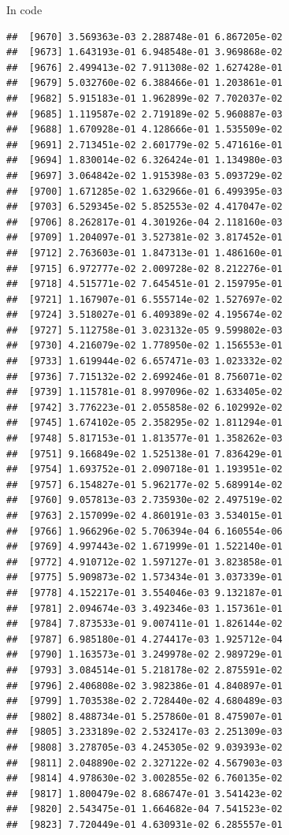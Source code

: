 \documentclass[ignorenonframetext,]{beamer}
\begin{document}
\begin{frame}[fragile]{In code}
\begin{verbatim}
##  [9670] 3.569363e-03 2.288748e-01 6.867205e-02
##  [9673] 1.643193e-01 6.948548e-01 3.969868e-02
##  [9676] 2.499413e-02 7.911308e-02 1.627428e-01
##  [9679] 5.032760e-02 6.388466e-01 1.203861e-01
##  [9682] 5.915183e-01 1.962899e-02 7.702037e-02
##  [9685] 1.119587e-02 2.719189e-02 5.960887e-03
##  [9688] 1.670928e-01 4.128666e-01 1.535509e-02
##  [9691] 2.713451e-02 2.601779e-02 5.471616e-01
##  [9694] 1.830014e-02 6.326424e-01 1.134980e-03
##  [9697] 3.064842e-02 1.915398e-03 5.093729e-02
##  [9700] 1.671285e-02 1.632966e-01 6.499395e-03
##  [9703] 6.529345e-02 5.852553e-02 4.417047e-02
##  [9706] 8.262817e-01 4.301926e-04 2.118160e-03
##  [9709] 1.204097e-01 3.527381e-02 3.817452e-01
##  [9712] 2.763603e-01 1.847313e-01 1.486160e-01
##  [9715] 6.972777e-02 2.009728e-02 8.212276e-01
##  [9718] 4.515771e-02 7.645451e-01 2.159795e-01
##  [9721] 1.167907e-01 6.555714e-02 1.527697e-02
##  [9724] 3.518027e-01 6.409389e-02 4.195674e-02
##  [9727] 5.112758e-01 3.023132e-05 9.599802e-03
##  [9730] 4.216079e-02 1.778950e-02 1.156553e-01
##  [9733] 1.619944e-02 6.657471e-03 1.023332e-02
##  [9736] 7.715132e-02 2.699246e-01 8.756071e-02
##  [9739] 1.115781e-01 8.997096e-02 1.633405e-02
##  [9742] 3.776223e-01 2.055858e-02 6.102992e-02
##  [9745] 1.674102e-05 2.358295e-02 1.811294e-01
##  [9748] 5.817153e-01 1.813577e-01 1.358262e-03
##  [9751] 9.166849e-02 1.525138e-01 7.836429e-01
##  [9754] 1.693752e-01 2.090718e-01 1.193951e-02
##  [9757] 6.154827e-01 5.962177e-02 5.689914e-02
##  [9760] 9.057813e-03 2.735930e-02 2.497519e-02
##  [9763] 2.157099e-02 4.860191e-03 3.534015e-01
##  [9766] 1.966296e-02 5.706394e-04 6.160554e-06
##  [9769] 4.997443e-02 1.671999e-01 1.522140e-01
##  [9772] 4.910712e-02 1.597127e-01 3.823858e-01
##  [9775] 5.909873e-02 1.573434e-01 3.037339e-01
##  [9778] 4.152217e-01 3.554046e-03 9.132187e-01
##  [9781] 2.094674e-03 3.492346e-03 1.157361e-01
##  [9784] 7.873533e-01 9.007411e-01 1.826144e-02
##  [9787] 6.985180e-01 4.274417e-03 1.925712e-04
##  [9790] 1.163573e-01 3.249978e-02 2.989729e-01
##  [9793] 3.084514e-01 5.218178e-02 2.875591e-02
##  [9796] 2.406808e-02 3.982386e-01 4.840897e-01
##  [9799] 1.703538e-02 2.728440e-02 4.680489e-03
##  [9802] 8.488734e-01 5.257860e-01 8.475907e-01
##  [9805] 3.233189e-02 2.532417e-03 2.251309e-03
##  [9808] 3.278705e-03 4.245305e-02 9.039393e-02
##  [9811] 2.048890e-02 2.327122e-02 4.567903e-03
##  [9814] 4.978630e-02 3.002855e-02 6.760135e-02
##  [9817] 1.800479e-02 8.686747e-01 3.541423e-02
##  [9820] 2.543475e-01 1.664682e-04 7.541523e-02
##  [9823] 7.720449e-01 4.630931e-02 6.285557e-01

\end{verbatim}
\end{frame}
\end{document}
